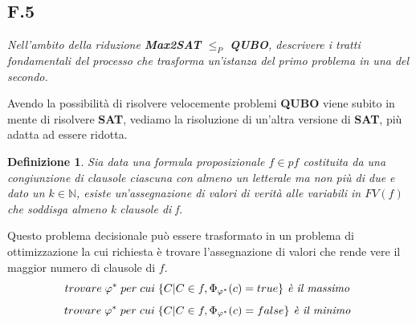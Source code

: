 \documentclass[a4paper]{article}
\newtheorem*{definition}{Definizione}
\begin{document}
\subsection{F.5}
\label{SEC:F5}
\emph{Nell’ambito della riduzione \textbf{Max2SAT} $\leq_P$ \textbf{QUBO}, descrivere i tratti fondamentali del processo che trasforma un’istanza del primo problema in una del secondo.}

Avendo la possibilità di risolvere velocemente problemi \textbf{QUBO} viene subito in mente di risolvere \textbf{SAT}, vediamo la risoluzione di un'altra versione di \textbf{SAT}, più adatta ad essere ridotta.
\begin{definition}
	Sia data una formula proposizionale $f \in pf$ costituita da una congiunzione di clausole ciascuna con almeno un letterale ma non più di due e dato un $k \in \mathbb{N}$, esiste un'assegnazione di valori di verità alle variabili in $FV(f)$ che soddisga almeno k clausole di f.
\end{definition}
Questo problema decisionale può essere trasformato in un problema di ottimizzazione la cui richiesta è trovare l'assegnazione di valori che rende vere il maggior numero di clausole di $f$.
$$ trovare \; \varphi^* \; per \; cui \; \{C \vert C \in f,  \Phi _ {\varphi^*}(c) = true \} \text{\textit{ è il massimo }}$$
$$ trovare \; \varphi^* \; per \; cui \; \{C \vert C \in f,  \Phi _ {\varphi^*}(c) = false \} \text{\textit{ è il minimo }}$$
\end{document}
